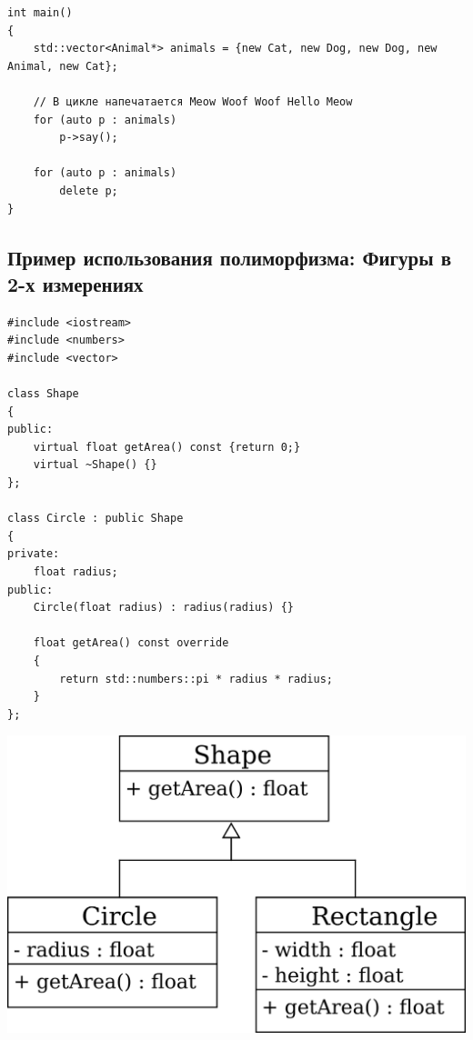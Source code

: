 \documentclass{article}
\begin{document}
\begin{lstlisting}[style=csMiptCppStyle]
int main()
{
    std::vector<Animal*> animals = {new Cat, new Dog, new Dog, new Animal, new Cat};
    
    // В цикле напечатается Meow Woof Woof Hello Meow
    for (auto p : animals)
        p->say();
    
    for (auto p : animals)
        delete p;
}
\end{lstlisting}

\newpage

\subsection*{Пример использования полиморфизма: Фигуры в 2-х измерениях}

\begin{minipage}{0.55\textwidth}
\begin{lstlisting}[style=csMiptCppStyle]
#include <iostream>
#include <numbers>
#include <vector>

class Shape
{
public:
    virtual float getArea() const {return 0;}
    virtual ~Shape() {}
};

class Circle : public Shape
{
private:
    float radius;
public:
    Circle(float radius) : radius(radius) {}
    
    float getArea() const override
    {
        return std::numbers::pi * radius * radius;
    }
};
\end{lstlisting}
\end{minipage}
\begin{minipage}{0.44\textwidth}
\begin{center}
\includegraphics[scale=0.8]{../images/shapes.png}
\end{center}
\end{minipage}
\end{document}
